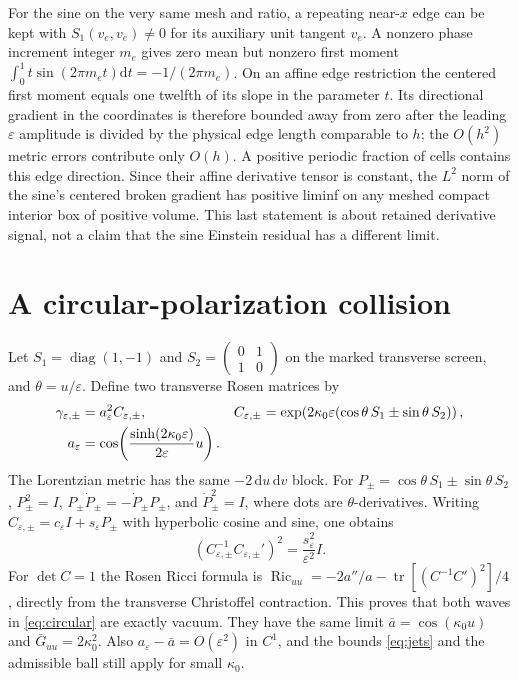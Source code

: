 \documentclass[11pt]{article}
\DeclareMathOperator{\Ric}{Ric}
\DeclareMathOperator{\tr}{tr}
\newcommand{\dd}{\mathrm d}
\begin{document}
For the sine on the very same mesh and ratio, a repeating
near-\(x\) edge can be kept with \(S_1(v_e,v_e)\ne0\) for
its auxiliary unit tangent \(v_e\). A nonzero phase increment
integer \(m_e\) gives zero mean but nonzero first moment
\(\int_0^1 t\sin(2\pi m_e t)\dd t=-1/(2\pi m_e)\).
On an affine edge restriction the centered first moment equals
one twelfth of its slope in the parameter \(t\). Its directional
gradient in the coordinates is therefore bounded away from
zero after the leading \(\varepsilon\) amplitude is divided
by the physical edge length comparable to \(h\); the
\(O(h^2)\) metric errors contribute only \(O(h)\).
A positive periodic fraction of cells contains this edge
direction. Since their affine derivative tensor is constant,
the \(L^2\) norm of the sine's centered broken gradient has
positive liminf on any meshed compact interior box of
positive volume. This last statement is about retained
derivative signal, not a claim that the sine Einstein residual
has a different limit.

\section{A circular-polarization collision}\label{sec:helicity}

Let \(S_1=\operatorname{diag}(1,-1)\) and
\(S_2=\left(\begin{smallmatrix}0&1\\1&0\end{smallmatrix}\right)\)
on the marked transverse screen, and \(\theta=u/\varepsilon\).
Define two transverse Rosen matrices by
\begin{align}
 \gamma_{\varepsilon,\pm}
   &=a_\varepsilon^2 C_{\varepsilon,\pm},&
 C_{\varepsilon,\pm}
   &=\exp\!\left(
       2\kappa_0\varepsilon(\cos\theta\,S_1\pm\sin\theta\,S_2)
              \right),\notag\\
 a_\varepsilon
   &=\cos\!\left(
       \frac{\sinh(2\kappa_0\varepsilon)}{2\varepsilon}u
          \right).
 \label{eq:circular}
\end{align}
The Lorentzian metric has the same \(-2\,\dd u\,\dd v\) block.
For \(P_\pm=\cos\theta\,S_1\pm\sin\theta\,S_2\),
\(P_\pm^2=I\), \(P_\pm\dot P_\pm=-\dot P_\pm P_\pm\), and
\(\dot P_\pm^2=I\), where dots are \(\theta\)-derivatives.
Writing \(C_{\varepsilon,\pm}=c_\varepsilon I+s_\varepsilon P_\pm\)
with hyperbolic cosine and sine, one obtains
\[
       (C_{\varepsilon,\pm}^{-1}C_{\varepsilon,\pm}')^2
               =\frac{s_\varepsilon^2}{\varepsilon^2}I .
\]
For \(\det C=1\) the Rosen Ricci formula is
\(\Ric_{uu}=-2a''/a-\tr[(C^{-1}C')^2]/4\), directly from the
transverse Christoffel contraction. This proves that both waves
in \eqref{eq:circular} are exactly vacuum. They have the same
limit \(\bar a=\cos(\kappa_0 u)\) and
\(\bar G_{uu}=2\kappa_0^2\). Also
\(a_\varepsilon-\bar a=O(\varepsilon^2)\) in \(C^1\), and the
bounds \eqref{eq:jets} and the admissible ball still apply
for small \(\kappa_0\).
\end{document}
